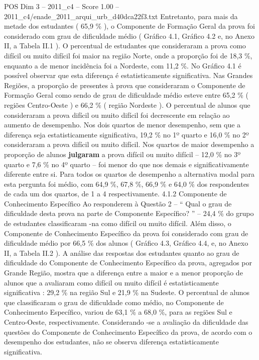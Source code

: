 \begin{textsample}{POS Dim 3 – 2011\_c4 – Score 1.00 – 2011\_c4/enade\_2011\_arqui\_urb\_d40dca22f3.txt}
Entretanto, para mais da metade dos estudantes ( 65,9 \% ), o Componente de Formação Geral da prova foi considerado com grau de dificuldade médio ( Gráfico 4.1, Gráfico 4.2 e, no Anexo II, a Tabela II.1 ).
O percentual de estudantes que consideraram a prova como difícil ou muito difícil foi maior na região Norte, onde a proporção foi de 18,3 \%, enquanto a de menor incidência foi a Nordeste, com 11,2 \%.
No Gráfico 4.1 é possível observar que esta diferença é estatisticamente significativa.
Nas Grandes Regiões, a proporção de presentes à prova que consideraram o Componente de Formação Geral como sendo de grau de dificuldade médio esteve entre 65,2 \% ( regiões Centro-Oeste ) e 66,2 \% ( região Nordeste ).
O percentual de alunos que consideraram a prova difícil ou muito difícil foi decrescente em relação ao aumento de desempenho.
Nos dois quartos de menor desempenho, sem que a diferença seja estatisticamente significativa, 19,2 \% no 1º quarto e 16,0 \% no 2º consideraram a prova difícil ou muito difícil.
Nos quartos de maior desempenho a proporção de alunos \textbf{julgaram} a prova difícil ou muito difícil – 12,0 \% no 3º quarto e 7,6 \% no 4º quarto – foi menor do que nos demais e significativamente diferente entre si.
Para todos os quartos de desempenho a alternativa modal para esta pergunta foi médio, com 64,9 \%, 67,8 \%, 66,9 \% e 64,0 \% dos respondentes de cada um dos quartos, de 1 a 4 respectivamente. 4.1.2 Componente de Conhecimento Específico Ao responderem à Questão 2 – “ Qual o grau de dificuldade desta prova na parte de Componente Específico? ” – 24,4 \% do grupo de estudantes classificaram -na como difícil ou muito difícil.
Além disso, o Componente de Conhecimento Específico da prova foi considerado com grau de dificuldade médio por 66,5 \% dos alunos ( Gráfico 4.3, Gráfico 4.4, e, no Anexo II, a Tabela II.2 ).
A análise das respostas dos estudantes quanto ao grau de dificuldade do Componente de Conhecimento Específico da prova, agregados por Grande Região, mostra que a diferença entre a maior e a menor proporção de alunos que a avaliaram como difícil ou muito difícil é estatisticamente significativa : 29,2 \% na região Sul e 21,9 \% na Sudeste.
O percentual de alunos que classificaram o grau de dificuldade como médio, no Componente de Conhecimento Específico, variou de 63,1 \% a 68,0 \%, para as regiões Sul e Centro-Oeste, respectivamente.
Considerando -se a avaliação da dificuldade das questões do Componente de Conhecimento Específico da prova, de acordo com o desempenho dos estudantes, não se observa diferença estatisticamente significativa.

\end{textsample}
